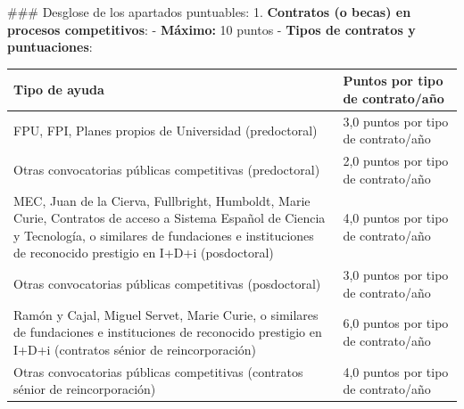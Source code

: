 \documentclass{article}
\begin{document}
\begin{itemize}
\begin{itemize}
                \#\#\# Desglose de los apartados puntuables:
                1. \textbf{Contratos (o becas) en procesos competitivos}:
                - \textbf{Máximo:} 10 puntos
                - \textbf{Tipos de contratos y puntuaciones}:
                \vspace{0.4cm}
                \begin{table}[h!]\centering\renewcommand{\arraystretch}{1.3}
                  \begin{tabular}{|p{}|p{}|}\hline
                    Tipo de ayuda                                                                                                                                                                                                       & Puntos por tipo de contrato/año     \\\hline
                    FPU, FPI, Planes propios de Universidad (predoctoral)                                                                                                                                                               & 3,0 puntos por tipo de contrato/año \\\hline
                    Otras convocatorias públicas competitivas (predoctoral)                                                                                                                                                             & 2,0 puntos por tipo de contrato/año \\\hline
                    MEC, Juan de la Cierva, Fullbright, Humboldt, Marie Curie, Contratos de acceso a Sistema Español de Ciencia y Tecnología, o similares de fundaciones e instituciones de reconocido prestigio en I+D+i (posdoctoral) & 4,0 puntos por tipo de contrato/año \\\hline
                    Otras convocatorias públicas competitivas (posdoctoral)                                                                                                                                                             & 3,0 puntos por tipo de contrato/año \\\hline
                    Ramón y Cajal, Miguel Servet, Marie Curie, o similares de fundaciones e instituciones de reconocido prestigio en I+D+i (contratos sénior de reincorporación)                                                        & 6,0 puntos por tipo de contrato/año \\\hline
                    Otras convocatorias públicas competitivas (contratos sénior de reincorporación)                                                                                                                                     & 4,0 puntos por tipo de contrato/año \\\hline
                  \end{tabular}\end{table}
                \vspace{0.4cm}


\end{itemize}
\end{itemize}
\end{document}
